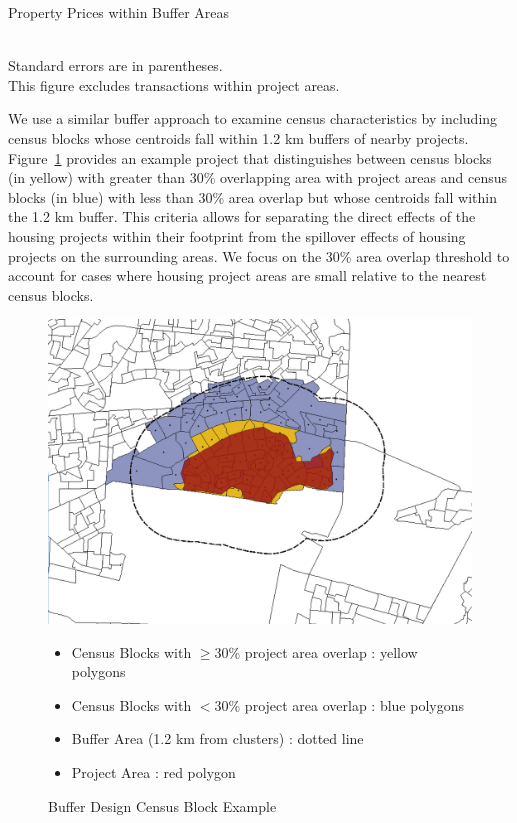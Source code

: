 \documentclass[12pt]{article}
\begin{document}
\begin{table}
\caption{Property Prices within Buffer Areas}\label{table:pricedescriptives}
\centering
 \\
Standard errors are in parentheses.  \\ This figure excludes transactions within project areas.
\end{table}

We use a similar buffer approach to examine census characteristics by including census blocks whose centroids fall within 1.2 km buffers of nearby projects.  Figure~\ref{figure:bufferdesigncensus} provides an example project that distinguishes between census blocks (in yellow) with greater than 30\% overlapping area with project areas and census blocks (in blue) with less than 30\% area overlap but whose centroids fall within the 1.2 km buffer.  This criteria allows for separating the direct effects of the housing projects within their footprint from the spillover effects of housing projects on the surrounding areas.  We focus on the 30\% area overlap threshold to account for cases where housing project areas are small relative to the nearest census blocks.

\begin{figure}
\caption{Buffer Design Census Block Example}\label{figure:bufferdesigncensus}
\centering
\includegraphics[scale=.4]{figures/design_7.png} 
\begin{itemize}
\item Census Blocks with $\geq$30\% project area overlap : yellow polygons 
\item Census Blocks with $<$30\% project area overlap : blue polygons
\item Buffer Area (1.2 km from clusters) : dotted line
\item Project Area : red polygon
\end{itemize}
\end{figure}
\end{document}

